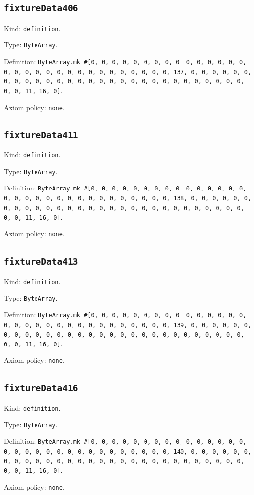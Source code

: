\documentclass[11pt]{article}
\begin{document}
\subsection*{\texttt{fixtureData406}}
\noindent Kind: \texttt{definition}.\par
\noindent Type: \texttt{ByteArray}.\par
\noindent Definition: \texttt{ByteArray.mk \#[0, 0, 0, 0, 0, 0, 0, 0, 0, 0, 0, 0, 0, 0, 0, 0, 0, 0, 0, 0, 0, 0, 0, 0, 0, 0, 0, 0, 0, 0, 0, 137, 0, 0, 0, 0, 0, 0, 0, 0, 0, 0, 0, 0, 0, 0, 0, 0, 0, 0, 0, 0, 0, 0, 0, 0, 0, 0, 0, 0, 0, 0, 0, 11, 16, 0]}.\par
\noindent Axiom policy: \texttt{none}.\par
\subsection*{\texttt{fixtureData411}}
\noindent Kind: \texttt{definition}.\par
\noindent Type: \texttt{ByteArray}.\par
\noindent Definition: \texttt{ByteArray.mk \#[0, 0, 0, 0, 0, 0, 0, 0, 0, 0, 0, 0, 0, 0, 0, 0, 0, 0, 0, 0, 0, 0, 0, 0, 0, 0, 0, 0, 0, 0, 0, 138, 0, 0, 0, 0, 0, 0, 0, 0, 0, 0, 0, 0, 0, 0, 0, 0, 0, 0, 0, 0, 0, 0, 0, 0, 0, 0, 0, 0, 0, 0, 0, 11, 16, 0]}.\par
\noindent Axiom policy: \texttt{none}.\par
\subsection*{\texttt{fixtureData413}}
\noindent Kind: \texttt{definition}.\par
\noindent Type: \texttt{ByteArray}.\par
\noindent Definition: \texttt{ByteArray.mk \#[0, 0, 0, 0, 0, 0, 0, 0, 0, 0, 0, 0, 0, 0, 0, 0, 0, 0, 0, 0, 0, 0, 0, 0, 0, 0, 0, 0, 0, 0, 0, 139, 0, 0, 0, 0, 0, 0, 0, 0, 0, 0, 0, 0, 0, 0, 0, 0, 0, 0, 0, 0, 0, 0, 0, 0, 0, 0, 0, 0, 0, 0, 0, 11, 16, 0]}.\par
\noindent Axiom policy: \texttt{none}.\par
\subsection*{\texttt{fixtureData416}}
\noindent Kind: \texttt{definition}.\par
\noindent Type: \texttt{ByteArray}.\par
\noindent Definition: \texttt{ByteArray.mk \#[0, 0, 0, 0, 0, 0, 0, 0, 0, 0, 0, 0, 0, 0, 0, 0, 0, 0, 0, 0, 0, 0, 0, 0, 0, 0, 0, 0, 0, 0, 0, 140, 0, 0, 0, 0, 0, 0, 0, 0, 0, 0, 0, 0, 0, 0, 0, 0, 0, 0, 0, 0, 0, 0, 0, 0, 0, 0, 0, 0, 0, 0, 0, 11, 16, 0]}.\par
\noindent Axiom policy: \texttt{none}.\par
\end{document}
